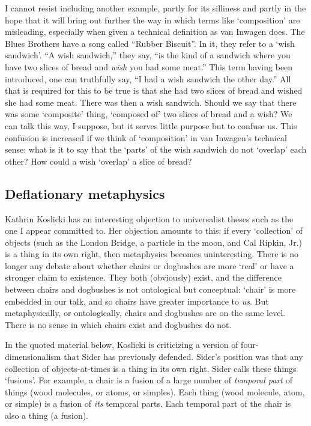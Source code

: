 \documentclass[11pt]{article}
\begin{document}
\begin{spacing}{1.25}
I cannot resist including another example, partly for its silliness
and partly in the hope that it will bring out further the way in which
terms like `composition' are misleading, especially when given a
technical definition as van Inwagen does.  The Blues Brothers have a
song called ``Rubber Biscuit''.  In it, they refer to a `wish
sandwich'.  ``A wish sandwich,'' they say, ``is the kind of a sandwich
where you have two slices of bread and {\em wish} you had some meat.''
This term having been introduced, one can truthfully say, ``I had a
wish sandwich the other day.''  All that is required for this to be
true is that she had two slices of bread and wished she had some meat.
There was then a wish sandwich.  Should we say that there was some
`composite' thing, `composed of' two slices of bread and a wish?  We
can talk this way, I suppose, but it serves little purpose but to
confuse us.  This confusion is increased if we think of `composition'
in van Inwagen's technical sense: what is it to say that the `parts'
of the wish sandwich do not `overlap' each other?  How could a wish
`overlap' a slice of bread?

\subsection{Deflationary metaphysics}
\label{deflate}
Kathrin Koslicki has an interesting objection to universalist theses
such as the one I appear committed to.  Her objection amounts to this:
if every `collection' of objects (such as the London Bridge, a
particle in the moon, and Cal Ripkin, Jr.) is a thing in its own
right, then metaphysics becomes uninteresting.  There is no longer any
debate about whether chairs or dogbushes are more `real' or have a
stronger claim to existence.  They both (obviously) exist, and the
difference between chairs and dogbushes is not ontological but
conceptual: `chair' is more embedded in our talk, and so chairs have
greater importance to {\em us}.  But metaphysically, or ontologically,
chairs and dogbushes are on the same level.  There is no sense in
which chairs exist and dogbushes do not.

In the quoted material below, Koslicki is criticizing a version of
four-dimensionalism that Sider has previously defended.  Sider's
position was that any collection of objects-at-times is a thing in its
own right.  Sider calls these things `fusions'.  For example, a chair
is a fusion of a large number of {\em temporal part} of things (wood
molecules, or atoms, or simples).  Each thing (wood molecule, atom, or
simple) is a fusion of {\em its} temporal parts.  Each temporal part
of the chair is also a thing (a fusion).


\end{spacing}
\end{document}
